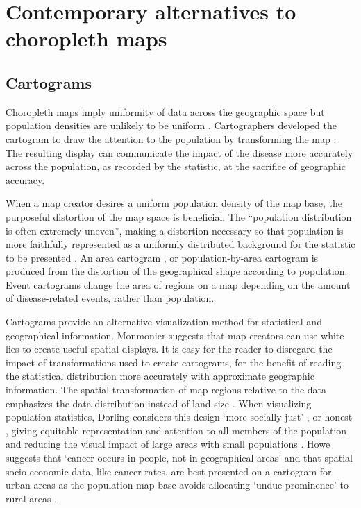 \documentclass{monashthesis}
\begin{document}
\hypertarget{ch:alternatives}{%
\section{Contemporary alternatives to choropleth maps}\label{ch:alternatives}}

\hypertarget{cartograms}{%
\subsection{Cartograms}\label{cartograms}}

Choropleth maps imply uniformity of data across the geographic space but population densities are unlikely to be uniform \autocite{BCM}. Cartographers developed the cartogram to draw the attention to the population by transforming the map \autocite{ACCAC}. The resulting display can communicate the impact of the disease more accurately across the population, as recorded by the statistic, at the sacrifice of geographic accuracy.

When a map creator desires a uniform population density of the map base, the purposeful distortion of the map space is beneficial. The ``population distribution is often extremely uneven'', making a distortion necessary so that population is more faithfully represented as a uniformly distributed background for the statistic to be presented \autocite{ACTUC} \autocite{CTTMB} \autocite{GOINO}. An area cartogram \autocite{NAC}, or population-by-area cartogram \autocite{TAAM} is produced from the distortion of the geographical shape according to population. Event cartograms \autocite{VSSDCUC} change the area of regions on a map depending on the amount of disease-related events, rather than population.

Cartograms provide an alternative visualization method for statistical and geographical information. Monmonier \autocite{HTLWM} suggests that map creators can use white lies to create useful spatial displays. It is easy for the reader to disregard the impact of transformations used to create cartograms, for the benefit of reading the statistical distribution more accurately with approximate geographic information. The spatial transformation of map regions relative to the data emphasizes the data distribution instead of land size \autocite{CBATCC}. When visualizing population statistics, Dorling considers this design `more socially just' \autocite{ACTUC}, or honest \autocite{NISCC}, giving equitable representation and attention to all members of the population and reducing the visual impact of large areas with small populations \autocite{DMAHP}. Howe \autocite{HEDP} suggests that `cancer occurs in people, not in geographical areas' and that spatial socio-economic data, like cancer rates, are best presented on a cartogram for urban areas as the population map base avoids allocating `undue prominence' to rural areas \autocite{CTTMB}.
\end{document}
